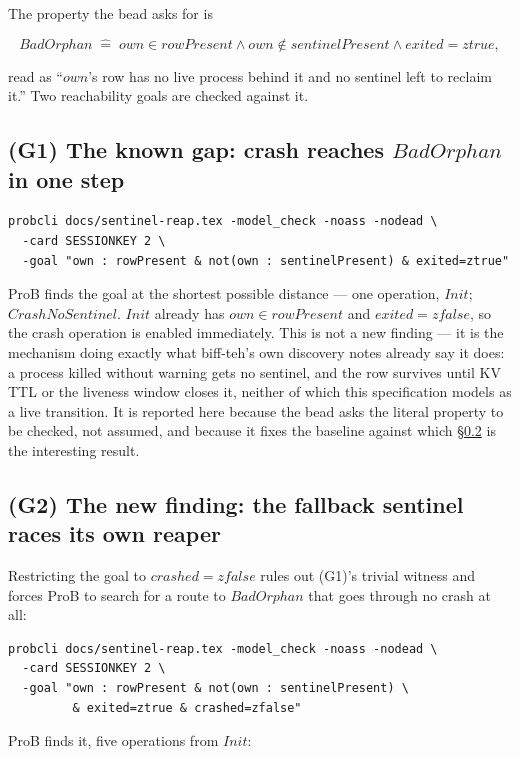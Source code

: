 \documentclass[a4paper,10pt,fleqn]{article}
\begin{document}
The property the bead asks for is

$$BadOrphan \;\widehat{=}\; own \in rowPresent \land own \notin sentinelPresent
\land exited = ztrue,$$

read as ``$own$'s row has no live process behind it and no sentinel
left to reclaim it.''  Two reachability goals are checked against it.

\subsection{(G1) The known gap: crash reaches $BadOrphan$ in one step}
\label{sec:crash-goal}

\begin{verbatim}
probcli docs/sentinel-reap.tex -model_check -noass -nodead \
  -card SESSIONKEY 2 \
  -goal "own : rowPresent & not(own : sentinelPresent) & exited=ztrue"
\end{verbatim}

ProB finds the goal at the shortest possible distance --- one
operation, $Init$; $CrashNoSentinel$.  $Init$ already has $own \in
rowPresent$ and
$exited = zfalse$, so the crash operation is enabled immediately.  This
is not a new finding --- it is the mechanism doing exactly what
biff-teh's own discovery notes already say it does: a process killed
without warning gets no sentinel, and the row survives until KV TTL or
the liveness window closes it, neither of which this specification
models as a live transition.  It is reported here because the bead asks
the literal property to be checked, not assumed, and because it fixes
the baseline against which \S\ref{sec:race} is the interesting result.

\subsection{(G2) The new finding: the fallback sentinel races its own reaper}
\label{sec:race}

Restricting the goal to $crashed = zfalse$ rules out (G1)'s trivial
witness and forces ProB to search for a route to $BadOrphan$ that goes
through no crash at all:

\begin{verbatim}
probcli docs/sentinel-reap.tex -model_check -noass -nodead \
  -card SESSIONKEY 2 \
  -goal "own : rowPresent & not(own : sentinelPresent) \
         & exited=ztrue & crashed=zfalse"
\end{verbatim}

ProB finds it, five operations from $Init$:
\end{document}
